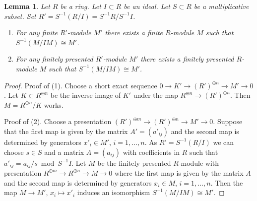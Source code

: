 \documentclass[10pt,a4paper]{amsart}
\theoremstyle{plain}
\newtheorem{lemma}[subsection]{Lemma}
\theoremstyle{definition}
\theoremstyle{remark}
\numberwithin{equation}{subsection}
\begin{document}
\begin{lemma}
\label{lemma-construct-fp-module}
Let $R$ be a ring.
Let $I \subset R$ be an ideal.
Let $S \subset R$ be a multiplicative subset.
Set $R' = S^{-1}(R/I) = S^{-1}R/S^{-1}I$.
\begin{enumerate}
\item For any finite $R'$-module $M'$ there exists a
finite $R$-module $M$ such that $S^{-1}(M/IM) \cong M'$.
\item For any finitely presented $R'$-module $M'$ there exists a
finitely presented $R$-module $M$ such that $S^{-1}(M/IM) \cong M'$.
\end{enumerate}
\end{lemma}

\begin{proof}
Proof of (1). Choose a short exact sequence
$0 \to K' \to (R')^{\oplus n} \to M' \to 0$.
Let $K \subset R^{\oplus n}$ be the inverse image of
$K'$ under the map $R^{\oplus n} \to (R')^{\oplus n}$.
Then $M = R^{\oplus n}/K$ works.

\medskip\noindent
Proof of (2).
Choose a presentation $(R')^{\oplus m} \to (R')^{\oplus n} \to M' \to 0$.
Suppose that the first map is given by the matrix
$A' = (a'_{ij})$ and the second map is determined by generators
$x'_i \in M'$, $i = 1, \ldots, n$. As $R' = S^{-1}(R/I)$ we can choose
$s \in S$ and a matrix $A = (a_{ij})$ with coefficients in $R$
such that $a'_{ij} = a_{ij} / s \bmod S^{-1}I$. Let $M$ be the
finitely presented $R$-module with presentation
$R^{\oplus m} \to R^{\oplus n} \to M \to 0$
where the first map is given by the matrix $A$ and the second map is
determined by generators $x_i \in M$, $i = 1, \ldots, n$.
Then the map $M \to M'$, $x_i \mapsto x'_i$ induces an isomorphism
$S^{-1}(M/IM) \cong M'$.
\end{proof}
\end{document}
